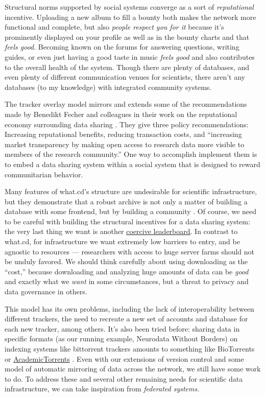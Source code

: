 \documentclass[10pt]{article}
\begin{document}
\begin{multicols}{2}
Structural norms supported by social systems converge as a sort of
\emph{reputational} incentive. Uploading a new album to fill a bounty
both makes the network more functional and complete, but also
\emph{people respect you for it} because it's prominently displayed on
your profile as well as in the bounty charts and that \emph{feels good}.
Becoming known on the forums for answering questions, writing guides, or
even just having a good taste in music \emph{feels good} and also
contributes to the overall health of the system. Though there are plenty
of databases, and even plenty of different communication venues for
scientists, there aren't any databases (to my knowledge) with integrated
community systems.

The tracker overlay model mirrors and extends some of the
recommendations made by Benedikt Fecher and colleagues in their work on
the reputational economy surrounding data sharing \cite{fecherReputationEconomyHow2017} . They give three policy
recommendations: Increasing reputational benefits, reducing transaction
costs, and ``increasing market transparency by making open access to
research data more visible to members of the research community.'' One
way to accomplish implement them is to embed a data sharing system
within a social system that is designed to reward communitarian
behavior.

Many features of what.cd's structure are undesirable for scientific
infrastructure, but they demonstrate that a robust archive is not only a
matter of building a database with some frontend, but by building a
community \cite{brossCommunityCollaborationContribution2013} . Of
course, we need to be careful with building the structural incentives
for a data sharing system: the very last thing we want is another
\href{https://etiennelebel.com/cs/t-leaderboard/t-leaderboard.html}{coercive
leaderboard}. In contrast to what.cd, for infrastructure we want
extremely low barriers to entry, and be agnostic to resources ---
researchers with access to huge server farms should not be unduly
favored. We should think carefully about using downloading as the
``cost,'' because downloading and analyzing huge amounts of data can be
\emph{good} and exactly what we \emph{want} in some circumstances, but a
threat to privacy and data governance in others.

This model has its own problems, including the lack of interoperability
between different trackers, the need to recreate a new set of accounts
and database for each new tracker, among others. It's also been tried
before: sharing data in specific formats (as our running example,
Neurodata Without Borders) on indexing systems like bittorrent trackers
amounts to something like BioTorrents \cite{langilleBioTorrentsFileSharing2010}  or
\href{https://academictorrents.com/}{AcademicTorrents} \cite{cohenAcademicTorrentsCommunityMaintained2014} . Even with our
extensions of version control and some model of automatic mirroring of
data across the network, we still have some work to do. To address these
and several other remaining needs for scientific data infrastructure, we
can take inspiration from \emph{federated systems.}


\end{multicols}
\end{document}
